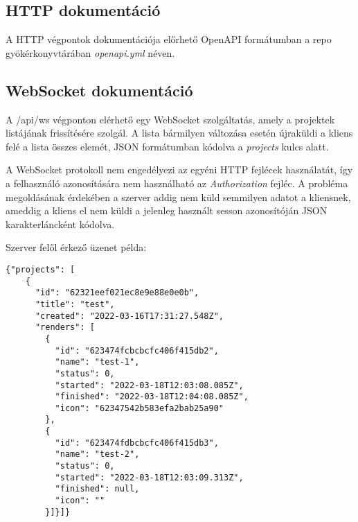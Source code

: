 \subsection{HTTP dokumentáció}
A HTTP végpontok dokumentációja előrhető OpenAPI formátumban a repo gyökérkonyvtárában \emph{openapi.yml} néven.

\subsection{WebSocket dokumentáció}
A /api/ws végponton elérhető egy WebSocket szolgáltatás, amely a projektek listájának frissítésére szolgál. A lista bármilyen változása esetén újraküldi a kliens felé a lista összes elemét, JSON formátumban kódolva a \emph{projects} kulcs alatt.

A WebSocket protokoll nem engedélyezi az egyéni HTTP fejlécek használatát, így a felhasználó azonosítására nem használható az \emph{Authorization} fejléc. A probléma megoldásának érdekében a szerver addig nem küld semmilyen adatot a kliensnek, ameddig a kliens el nem küldi a jelenleg használt sesson azonosítóján JSON karakterláncként kódolva.

Szerver felől érkező üzenet példa:
\begin{lstlisting}
{"projects": [
    {
      "id": "62321eef021ec8e9e88e0e0b",
      "title": "test",
      "created": "2022-03-16T17:31:27.548Z",
      "renders": [
        {
          "id": "623474fcbcbcfc406f415db2",
          "name": "test-1",
          "status": 0,
          "started": "2022-03-18T12:03:08.085Z",
          "finished": "2022-03-18T12:04:08.085Z",
          "icon": "62347542b583efa2bab25a90"
        },
        {
          "id": "623474fdbcbcfc406f415db3",
          "name": "test-2",
          "status": 0,
          "started": "2022-03-18T12:03:09.313Z",
          "finished": null,
          "icon": ""
        }]}]}
\end{lstlisting}